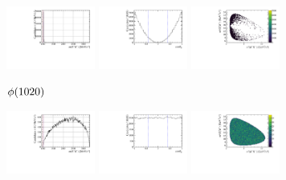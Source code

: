 \begin{figure}[!h]
    \centering
    \begin{subfigure}[t]{1.0\textwidth}
       \includegraphics[width=0.32\textwidth]{figs/B2DsPhi/phi_phi_mass.pdf}
       \includegraphics[width=0.32\textwidth]{figs/B2DsPhi/phi_Helicity.pdf}
       \includegraphics[width=0.32\textwidth]{figs/B2DsPhi/phi_Dalitz_plot.pdf}
       \caption{$\phi(1020)$} 
       \label{fig:B2DsKK_model_phi}
    \end{subfigure}
    \begin{subfigure}[t]{1.0\textwidth}
        \includegraphics[width=0.32\textwidth]{figs/B2DsPhi/NR_phi_mass.pdf}
        \includegraphics[width=0.32\textwidth]{figs/B2DsPhi/NR_Helicity.pdf}
        \includegraphics[width=0.32\textwidth]{figs/B2DsPhi/NR_Dalitz_plot.pdf}

\end{subfigure}
\end{figure}
